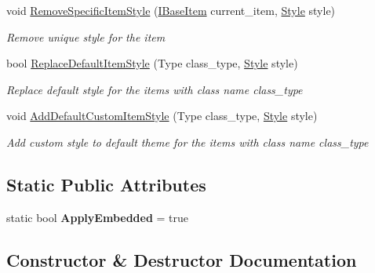 \begin{DoxyCompactItemize}
void \mbox{\hyperlink{class_space_v_i_l_1_1_decorations_1_1_theme_style_aaac83c6974b4f43b6afbef2f99f07500}{Remove\+Specific\+Item\+Style}} (\mbox{\hyperlink{interface_space_v_i_l_1_1_core_1_1_i_base_item}{I\+Base\+Item}} current\+\_\+item, \mbox{\hyperlink{class_space_v_i_l_1_1_decorations_1_1_style}{Style}} style)
\begin{DoxyCompactList}\small\item\em Remove unique style for the item \end{DoxyCompactList}\item 
bool \mbox{\hyperlink{class_space_v_i_l_1_1_decorations_1_1_theme_style_a2c4e4d68ff2ae31bc250bc4585217133}{Replace\+Default\+Item\+Style}} (Type class\+\_\+type, \mbox{\hyperlink{class_space_v_i_l_1_1_decorations_1_1_style}{Style}} style)
\begin{DoxyCompactList}\small\item\em Replace default style for the items with class name class\+\_\+type \end{DoxyCompactList}\item 
void \mbox{\hyperlink{class_space_v_i_l_1_1_decorations_1_1_theme_style_abb9f54aa9f7a8e66ac0dc7c9684d6270}{Add\+Default\+Custom\+Item\+Style}} (Type class\+\_\+type, \mbox{\hyperlink{class_space_v_i_l_1_1_decorations_1_1_style}{Style}} style)
\begin{DoxyCompactList}\small\item\em Add custom style to default theme for the items with class name class\+\_\+type \end{DoxyCompactList}\end{DoxyCompactItemize}
\subsection*{Static Public Attributes}
\begin{DoxyCompactItemize}
\item 
\mbox{\label{class_space_v_i_l_1_1_decorations_1_1_theme_style_a514a776a600832e9488195abcc9a458e}} 
static bool {\bfseries Apply\+Embedded} = true
\end{DoxyCompactItemize}


\subsection{Constructor \& Destructor Documentation}
\mbox{\label{class_space_v_i_l_1_1_decorations_1_1_theme_style_a95d8f9c2056dc143d38e3faa0aa2aa68}} 
